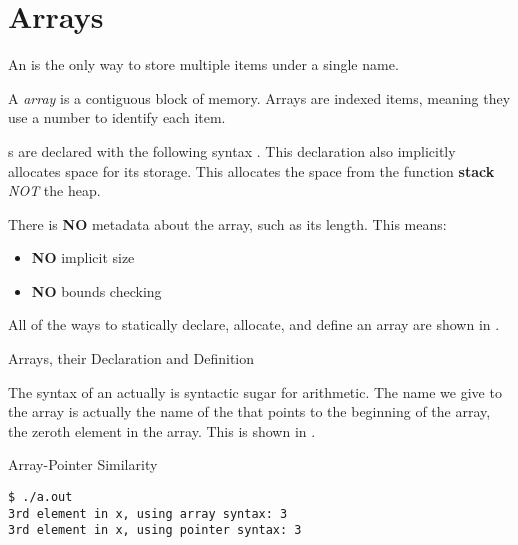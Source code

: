 \section{Arrays}\label{sec:Arrays}
An  is the only way to store multiple items under a single name.

\begin{definition}[Array]\label{def:Array}
  A \emph{array} is a contiguous block of memory.
  Arrays are indexed items, meaning they use a number to identify each item.
\end{definition}

s are declared with the following syntax .
This declaration also implicitly allocates space for its storage.
This allocates the space from the function \textbf{stack} \textit{NOT} the heap.

There is \textbf{NO} metadata about the array, such as its length.
This means:
\begin{itemize}[noitemsep]
\item \textbf{NO} implicit size
\item \textbf{NO} bounds checking
\end{itemize}

All of the ways to statically declare, allocate, and define an array are shown in .

\begin{listing}[h!tbp]
\caption{Arrays, their Declaration and Definition}
\label{lst:Arrays}
\end{listing}

The syntax of an  actually is syntactic sugar for  arithmetic.
The name we give to the array is actually the name of the \textbf{} that points to the beginning of the array, the zeroth element in the array.
This is shown in .

\begin{listing}[h!tbp]
\caption{Array-Pointer Similarity}
\label{lst:Array_Pointer_Similarity}
\begin{verbatim}
$ ./a.out
3rd element in x, using array syntax: 3
3rd element in x, using pointer syntax: 3
\end{verbatim}
\end{listing}


